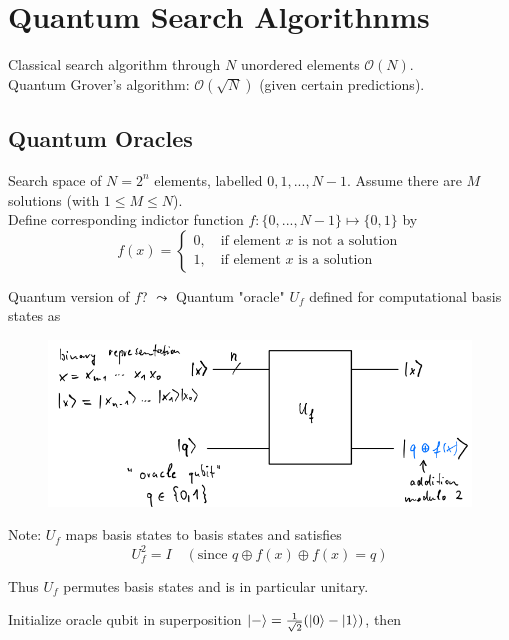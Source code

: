 \section{Quantum Search Algorithnms}
Classical search algorithm through $N$ unordered elements $\mathcal{O}(N)$. \\
Quantum Grover's algorithm: $\mathcal{O}(\sqrt{N})$ (given certain predictions).

\subsection{Quantum Oracles}
Search space of $N = 2^n$ elements, labelled $0, 1, ..., N - 1$.
Assume there are $M$ solutions (with $1 \leq M \leq N$). \\
Define corresponding indictor function $f : \{0, ..., N - 1\} \mapsto \{0, 1\}$
by 
\begin{equation}
    f(x) = \begin{cases}
        0, \quad \text{if element $x$ is not a solution} \\
        1, \quad \text{if element $x$ is a solution}
    \end{cases}
\end{equation}

Quantum version of $f$?
$\leadsto$ Quantum "oracle" $U_f$ defined for computational basis states as

\begin{figure}[H]
    \centering
    \includegraphics[scale=0.5]{chapters/res/quantum-circuit-oracle.png}
\end{figure}

Note: $U_f$ maps basis states to basis states and satisfies 
\begin{equation}
U_f^2 = I \quad (\text{since } q \oplus f(x) \oplus f(x) = q)
\end{equation}

Thus $U_f$ permutes basis states and is in particular unitary.

Initialize oracle qubit in superposition $\lvert-\rangle = \frac{1}{\sqrt{2}}(\lvert0\rangle - \lvert1\rangle)$, 
then 

